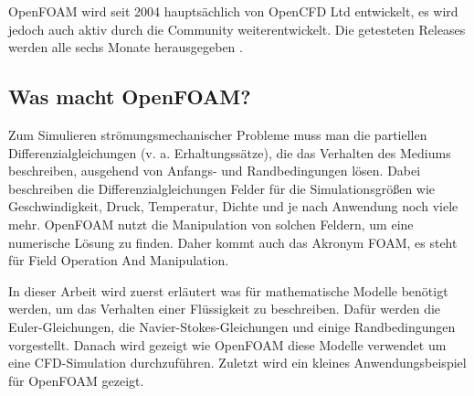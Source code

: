OpenFOAM wird seit 2004 hauptsächlich von OpenCFD Ltd entwickelt, es wird jedoch auch aktiv durch die Community weiterentwickelt.
Die getesteten Releases werden alle sechs Monate herausgegeben \cite{openfoam:greenshieldsweller2022}.

\subsection{Was macht OpenFOAM?}
Zum Simulieren strömungsmechanischer Probleme muss man die partiellen Differenzialgleichungen (v. a. Erhaltungssätze), die das Verhalten des Mediums beschreiben, ausgehend von Anfangs- und Randbedingungen lösen.
Dabei beschreiben die Differenzialgleichungen Felder für die Simulationsgrößen wie Geschwindigkeit, Druck, Temperatur, Dichte und je nach Anwendung noch viele mehr. OpenFOAM nutzt die Manipulation von solchen Feldern, um eine numerische Lösung zu finden. Daher kommt auch das Akronym FOAM, es steht für Field Operation And Manipulation.

In dieser Arbeit wird zuerst erläutert was für mathematische Modelle benötigt werden, um das Verhalten einer Flüssigkeit zu beschreiben.
Dafür werden die Euler-Gleichungen, die Navier-Stokes-Gleichungen und einige Randbedingungen vorgestellt.
Danach wird gezeigt wie OpenFOAM diese Modelle verwendet um eine CFD-Simulation durchzuführen.
Zuletzt wird ein kleines Anwendungsbeispiel für OpenFOAM gezeigt.